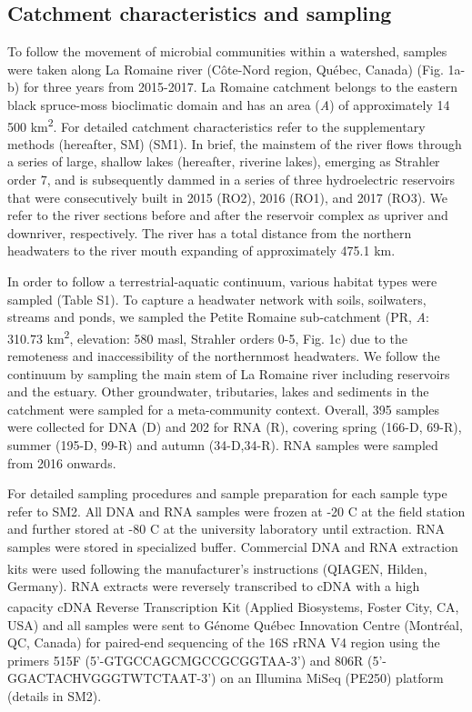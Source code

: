 \documentclass[12pt,a4paper]{article} %
\begin{document}
\subsection*{Catchment characteristics and sampling}
To follow the movement of microbial communities within a watershed, samples were taken along La Romaine river (C\^{o}te-Nord region, Qu\'{e}bec, Canada) (Fig. 1a-b) for three years from 2015-2017. La Romaine catchment belongs to the eastern black spruce-moss bioclimatic domain and has an area (\textit{A}) of approximately 14 500 km\textsuperscript{2}. For detailed catchment characteristics refer to the supplementary methods (hereafter, SM) (SM1). In brief, the mainstem of the river flows through a series of large, shallow lakes (hereafter, riverine lakes), emerging as Strahler order 7, and is subsequently dammed in a series of three hydroelectric reservoirs that were consecutively built in 2015 (RO2), 2016 (RO1), and 2017 (RO3). We refer to the river sections before and after the reservoir complex as upriver and downriver, respectively. The river has a total distance from the northern headwaters to the river mouth expanding of approximately 475.1 km.

In order to follow a terrestrial-aquatic continuum, various habitat types were sampled (Table S1). To capture a headwater network with soils, soilwaters, streams and ponds, we sampled the Petite Romaine sub-catchment (PR, \textit{A}: 310.73 km\textsuperscript{2}, elevation: 580 masl, Strahler orders 0-5, Fig. 1c) due to the remoteness and inaccessibility of the northernmost headwaters. We follow the continuum by sampling the main stem of La Romaine river including reservoirs and the estuary. Other groundwater, tributaries, lakes and sediments in the catchment were sampled for a meta-community context. Overall, 395 samples were collected for DNA (D) and 202 for RNA (R), covering spring (166-D, 69-R), summer (195-D, 99-R) and autumn (34-D,34-R). RNA samples were sampled from 2016 onwards.

For detailed sampling procedures and sample preparation for each sample type refer to SM2. All DNA and RNA samples were frozen at -20 \textdegree{}C at the field station and further stored at -80 \textdegree{}C at the university laboratory until extraction. RNA samples were stored in specialized buffer. Commercial DNA and RNA extraction kits were used following the manufacturer's instructions (QIAGEN\textsuperscript{\textregistered}, Hilden, Germany). RNA extracts were reversely transcribed to cDNA with a high capacity cDNA Reverse Transcription Kit (Applied Biosystems\textsuperscript{\texttrademark}, Foster City, CA, USA) and all samples were sent to G\'{e}nome Qu\'{e}bec Innovation Centre (Montr\'{e}al, QC, Canada) for paired-end sequencing of the 16S rRNA V4 region using the primers 515F (5'-GTGCCAGCMGCCGCGGTAA-3') and 806R (5'-GGACTACHVGGGTWTCTAAT-3') on an Illumina MiSeq (PE250) platform (details in SM2).
\end{document}
